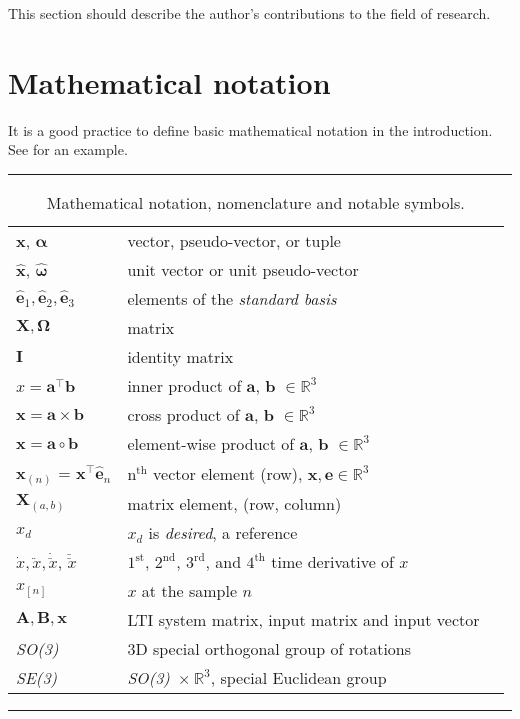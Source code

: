 This section should describe the author's contributions to the field of research.

\section{Mathematical notation}

It is a good practice to define basic mathematical notation in the introduction.
See  for an example.

\begin{table*}[!h]
  \scriptsize
  \centering
  \noindent\rule{\textwidth}{0.5pt}
  \begin{tabular}{lll}
    $\mathbf{x}$, $\bm{\alpha}$ & vector, pseudo-vector, or tuple\\
    $\mathbf{\hat{x}}$, $\bm{\hat{\omega}}$& unit vector or unit pseudo-vector\\
    $\mathbf{\hat{e}}_1, \mathbf{\hat{e}}_2, \mathbf{\hat{e}}_3$ & elements of the \emph{standard basis} \\
    $\mathbf{X}, \bm{\Omega}$ & matrix \\
    $\mathbf{I}$ & identity matrix \\
    $x = \mathbf{a}^\intercal\mathbf{b}$ & inner product of $\mathbf{a}$, $\mathbf{b}$ $\in \mathbb{R}^3$\\
    $\mathbf{x} = \mathbf{a}\times\mathbf{b}$ & cross product of $\mathbf{a}$, $\mathbf{b}$ $\in \mathbb{R}^3$\\
    $\mathbf{x} = \mathbf{a}\circ\mathbf{b}$ & element-wise product of $\mathbf{a}$, $\mathbf{b}$ $\in \mathbb{R}^3$ \\
    $\mathbf{x}_{(n)}$ = $\mathbf{x}^\intercal\mathbf{\hat{e}}_n$ & $\mathrm{n}^{\mathrm{th}}$ vector element (row), $\mathbf{x}, \mathbf{e} \in \mathbb{R}^3$\\
    $\mathbf{X}_{(a,b)}$ & matrix element, (row, column)\\
    $x_{d}$ & $x_d$ is \emph{desired}, a reference\\
    $\dot{x}, \ddot{x}, \dot{\ddot{x}}$, $\ddot{\ddot{x}}$ & ${1^{\mathrm{st}}}$, ${2^{\mathrm{nd}}}$, ${3^{\mathrm{rd}}}$, and ${4^{\mathrm{th}}}$ time derivative of $x$\\
    $x_{[n]}$ & $x$ at the sample $n$ \\
    $\mathbf{A}, \mathbf{B}, \mathbf{x}$ & LTI system matrix, input matrix and input vector\\
    \emph{SO(3)} & 3D special orthogonal group of rotations\\
    \emph{SE(3)} & \emph{SO(3)}~$\times~\mathbb{R}^3$, special Euclidean group\\
  \end{tabular}
  \noindent\rule{\textwidth}{0.5pt}
  \caption{Mathematical notation, nomenclature and notable symbols.}
  \label{tab:mathematical_notation}
\end{table*}
